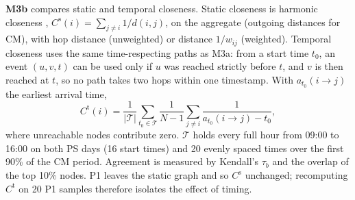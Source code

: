 \textbf{M3b} compares static and temporal closeness. Static closeness is harmonic
closeness \citep{marchiori2000harmony}, $C^{\mathrm{s}}(i)=\sum_{j\neq i}1/d(i,j)$, on
the aggregate (outgoing distances for CM), with hop distance (unweighted) or distance
$1/w_{ij}$ (weighted). Temporal closeness \citep{pan2011path,kim2012temporal} uses the
same time-respecting paths as M3a: from a start time $t_0$, an event $(u,v,t)$ can be
used only if $u$ was reached strictly before $t$, and $v$ is then reached at $t$, so no
path takes two hops within one timestamp. With $a_{t_0}(i\to j)$ the earliest arrival
time,
\begin{equation}
  C^{\mathrm{t}}(i)=\frac{1}{|\mathcal{T}|}\sum_{t_0\in\mathcal{T}}\frac{1}{N-1}
  \sum_{j\neq i}\frac{1}{a_{t_0}(i\to j)-t_0},
\end{equation}
where unreachable nodes contribute zero. $\mathcal{T}$ holds every full hour from
09:00 to 16:00 on both PS days (16 start times) and 20 evenly spaced times over the
first 90\% of the CM period. Agreement is measured by Kendall's $\tau_b$ and the overlap
of the top 10\% nodes. P1 leaves the static graph and so $C^{\mathrm{s}}$ unchanged;
recomputing $C^{\mathrm{t}}$ on 20 P1 samples therefore isolates the effect of timing.

